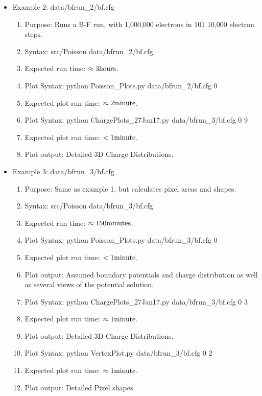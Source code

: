 \documentclass{article} %
\begin{document}
\begin{itemize}
      \item Example 2: data/bfrun\_2/bf.cfg
    \begin{enumerate}
      \item Purpose: Runs a B-F run, with 1,000,000 electrons in 101 10,000 electron steps.
      \item Syntax: src/Poisson data/bfrun\_2/bf.cfg
      \item Expected run time: $\rm \approx 3 hours$.
      \item Plot Syntax: python Poisson\_Plots.py data/bfrun\_2/bf.cfg 0
      \item Expected plot run time: $\rm \approx 2 minute$.
      \item Plot Syntax: python ChargePlots\_27Jan17.py data/bfrun\_3/bf.cfg 0 9
      \item Expected plot run time: $\rm <1 minute$.
      \item Plot output: Detailed 3D Charge Distributions.

    \end{enumerate}

  \item Example 3: data/bfrun\_3/bf.cfg
    \begin{enumerate}
      \item Purpose: Same as example 1, but calculates pixel areas and shapes.
      \item Syntax: src/Poisson data/bfrun\_3/bf.cfg
      \item Expected run time: $\rm \approx 150 minutes$.
      \item Plot Syntax: python Poisson\_Plots.py data/bfrun\_3/bf.cfg 0
      \item Expected plot run time: $\rm <1 minute$.
      \item Plot output: Assumed boundary potentials and charge distribution as well as several views of the potential solution. 
      \item Plot Syntax: python ChargePlots\_27Jan17.py data/bfrun\_3/bf.cfg 0 3
      \item Expected plot run time: $\rm \approx 1 minute$.
      \item Plot output: Detailed 3D Charge Distributions.
      \item Plot Syntax: python VertexPlot.py data/bfrun\_3/bf.cfg 0 2
      \item Expected plot run time: $\rm \approx 1 minute$.
      \item Plot output: Detailed Pixel shapes
    \end{enumerate}

    
\end{itemize}
\end{document}
